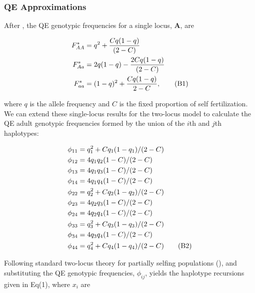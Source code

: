 \documentclass{article}
\newcommand\numberthis{\addtocounter{equation}{1}\tag{\theequation}}
\begin{document}
\subsubsection*{QE Approximations}

After \citet{CaballeroHill1992}, the QE genotypic frequencies for a single locus, $\mathbf{A}$, are

\begin{align*}
	F_{AA}^* &= q^2 + \frac{C q(1 - q)}{(2 - C)} \\
	F_{Aa}^* &= 2 q (1 - q) - \frac{2 C q(1 - q)}{(2 - C)} \\
	F_{aa}^* &= (1 - q)^2 + \frac{C q(1 - q)}{2 - C}, \numberthis 
\end{align*}

\noindent{} where $q$ is the allele frequency and $C$ is the fixed proportion of self fertilization. We can extend these single-locus results for the two-locus model to calculate the QE adult genotypic frequencies formed by the union of the $i$th and $j$th haplotypes:

\begin{align*}
	\phi_{11} &= q_1^2 + C q_1 (1 - q_1) / (2-C)  \\
	\phi_{12} &= 4 q_1 q_2 (1 - C) / (2-C)        \\
	\phi_{13} &= 4 q_1 q_3 (1 - C) / (2-C)        \\
	\phi_{14} &= 4 q_1 q_4 (1 - C) / (2-C)        \\
	\phi_{22} &= q_2^2 + C q_2 (1 - q_2) / (2-C)  \\
	\phi_{23} &= 4 q_2 q_3 (1 - C) / (2-C)        \\
	\phi_{24} &= 4 q_2 q_4 (1 - C) / (2-C)        \\
	\phi_{33} &= q_3^2 + C q_3 (1 - q_3) / (2-C)  \\
	\phi_{34} &= 4 q_3 q_4 (1 - C) / (2-C)        \\
	\phi_{44} &= q_4^2 + C q_4 (1 - q_4) / (2-C)  \numberthis
\end{align*}

Following standard two-locus theory for partially selfing populations (\citealt{Holden1979, OttoDay2007, JordanConn2014}), and substituting the QE genotypic frequencies, $\phi_{ij}$, yields the haplotype recursions given in Eq(1), where $x_{i}$ are
\end{document}
